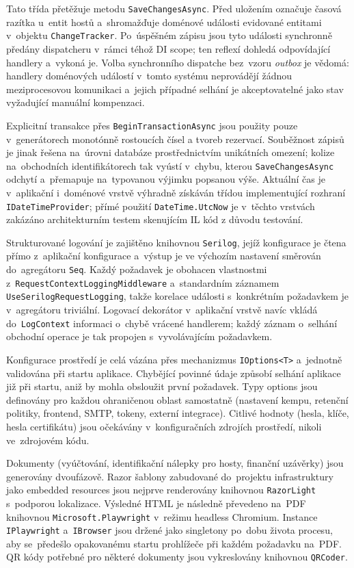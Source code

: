 Tato třída přetěžuje metodu \texttt{SaveChangesAsync}.
Před uložením označuje časová razítka u~entit hostů a~shromažďuje doménové události evidované entitami v~objektu \texttt{ChangeTracker}.
Po~úspěšném zápisu jsou tyto události synchronně předány dispatcheru v~rámci téhož DI scope; ten reflexí dohledá odpovídající handlery a~vykoná je.
Volba synchronního dispatche bez~vzoru \emph{outbox} je vědomá: handlery doménových událostí v~tomto systému neprovádějí žádnou meziprocesovou komunikaci a~jejich případné selhání je akceptovatelné jako stav vyžadující manuální kompenzaci.

Explicitní transakce přes \texttt{BeginTransactionAsync} jsou použity pouze v~generátorech monotónně rostoucích čísel a tvoreb rezervací.
Souběžnost zápisů je jinak řešena na~úrovni databáze prostřednictvím unikátních omezení; kolize na~obchodních identifikátorech tak vyústí v~chybu, kterou \texttt{SaveChangesAsync} odchytí a~přemapuje na~typovanou výjimku popsanou výše.
Aktuální čas je v~aplikační i~doménové vrstvě výhradně získáván třídou implementující rozhraní \texttt{IDateTimeProvider}; přímé použití \texttt{DateTime.UtcNow} je v~těchto vrstvách zakázáno architekturním testem skenujícím IL kód z důvodu testování.

Strukturované logování je zajištěno knihovnou \texttt{Serilog}, jejíž konfigurace je čtena přímo z~aplikační konfigurace a~výstup je ve výchozím nastavení směrován do~agregátoru \texttt{Seq}.
Každý požadavek je obohacen vlastnostmi z~\texttt{RequestContextLoggingMiddleware} a~standardním záznamem \texttt{UseSerilogRequestLogging}, takže korelace události s~konkrétním požadavkem je v~agregátoru triviální.
Logovací dekorátor v~aplikační vrstvě navíc vkládá do~\texttt{LogContext} informaci o~chybě vrácené handlerem; každý záznam o~selhání obchodní operace je tak propojen s~vyvolávajícím požadavkem.

Konfigurace prostředí je celá vázána přes mechanizmus \texttt{IOptions<T>} a~jednotně validována při startu aplikace.
Chybějící povinné údaje způsobí selhání aplikace již při startu, aniž by mohla obsloužit první požadavek.
Typy options jsou definovány pro každou ohraničenou oblast samostatně (nastavení kempu, retenční politiky, frontend, SMTP, tokeny, externí integrace).
Citlivé hodnoty (hesla, klíče, hesla certifikátu) jsou očekávány v~konfiguračních zdrojích prostředí, nikoli ve~zdrojovém kódu.

Dokumenty (vyúčtování, identifikační nálepky pro hosty, finanční uzávěrky) jsou generovány dvoufázově.
Razor šablony zabudované do~projektu infrastruktury jako embedded resources jsou nejprve renderovány knihovnou \texttt{RazorLight} s~podporou lokalizace.
Výsledné HTML je následně převedeno na~PDF knihovnou \texttt{Microsoft.Playwright} v~režimu headless Chromium.
Instance \texttt{IPlaywright} a~\texttt{IBrowser} jsou držené jako singletony po~dobu života procesu, aby se~předešlo opakovanému startu prohlížeče při každém požadavku na~PDF.
QR kódy potřebné pro některé dokumenty jsou vykreslovány knihovnou \texttt{QRCoder}.

